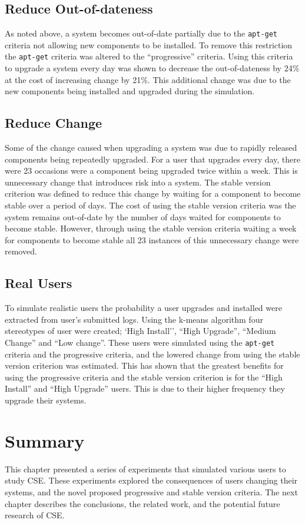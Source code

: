 \subsection{Reduce Out-of-dateness}
As noted above, a system becomes out-of-date partially due to the \texttt{apt-get} criteria not allowing new components to be installed.
To remove this restriction the \texttt{apt-get} criteria was altered to the ``progressive'' criteria.
Using this criteria to upgrade a system every day was shown to decrease the out-of-dateness by 24\% at the cost of increasing change by 21\%.
This additional change was due to the new components being installed and upgraded during the simulation.

\subsection{Reduce Change}
Some of the change caused when upgrading a system was due to rapidly released components being repeatedly upgraded.
For a user that upgrades every day, there were 23 occasions were a component being upgraded twice within a week.
This is unnecessary change that introduces risk into a system. 
The stable version criterion was defined to reduce this change by waiting for a component to become stable over a period of days.
The cost of using the stable version criteria was the system remains out-of-date by the number of days waited for components to become stable.
However, through using the stable version criteria waiting a week for components to become stable all 23 instances of this unnecessary change were removed.

\subsection{Real Users}
To simulate realistic users the probability a user upgrades and installed were extracted from user's submitted logs.
Using the k-means algorithm four stereotypes of user were created; `High Install'', ``High Upgrade'', ``Medium Change'' and ``Low change''.
These users were simulated using the \texttt{apt-get} criteria and the progressive criteria, and the lowered change from using the stable version criterion was estimated.
This has shown that the greatest benefits for using the progressive criteria and the stable version criterion is for the ``High Install'' and ``High Upgrade'' users.
This is due to their higher frequency they upgrade their systems.

\section{Summary}
This chapter presented a series of experiments that simulated various users to study CSE.
These experiments explored the consequences of users changing their systems, and the novel proposed progressive and stable version criteria.
The next chapter describes the conclusions, the related work, and the potential future research of CSE.



